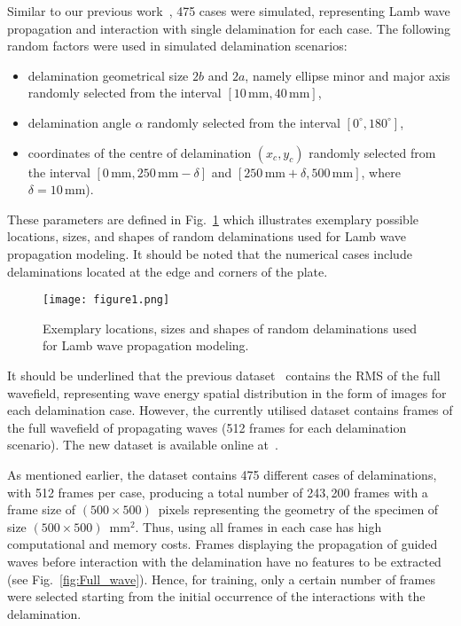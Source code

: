 \begin{sloppypar}
	Similar to our previous work~\cite{Ijjeh2021, Ijjeh2022}, 475 cases were simulated, representing Lamb wave propagation and interaction with single delamination for each case. 
	The following random factors were used in simulated delamination scenarios:
	\begin{itemize}
		\item delamination geometrical size	\(2b\) and \(2a\), namely ellipse minor and major axis randomly selected from the interval \(\left[10 \, \textrm{mm}, 40\, \textrm{mm}\right]\),
		\item delamination angle \(\alpha\) randomly selected from the interval \( \left[ 0^{\circ}, 180^{\circ} \right]\),
		\item coordinates of the centre of delamination \((x_c,y_c)\) randomly selected from the interval \(\left[0\, \textrm{mm}, 250\, \textrm{mm} -\delta \right]\) and \( \left[250\, \textrm{mm}+\delta, 500\, \textrm{mm} \right] \), where \(\delta = 10\, \textrm{mm}\)).
	\end{itemize}
	These parameters are defined in Fig.~\ref{fig:random_delaminations} which illustrates exemplary possible locations, sizes, and shapes of random delaminations used for Lamb wave propagation modeling.
	It should be noted that the numerical cases include delaminations located at the edge and corners of the plate.
	\DIFaddbegin {}\DIFaddend \begin{figure}[!ht]
		\centering
		\texttt{[image: figure1.png]}
		\caption{Exemplary locations, sizes and shapes of random delaminations used for Lamb wave propagation modeling.}
		\label{fig:random_delaminations}
	\end{figure}

	It should be underlined that the previous dataset~\cite{Kudela2020d} contains the RMS of the full wavefield, representing wave energy spatial distribution in the form of images for each delamination case.
	However, the currently utilised dataset contains frames of the full wavefield of propagating waves (512 frames for each delamination scenario).
	The new dataset is available online at~\cite{kudela_pawel_2021_5414555}.

	As mentioned earlier, the dataset contains 475 different cases of delaminations, with 512 frames per case, producing a total number of 243,\,200 frames with a frame size of \((500\times500)\)~pixels representing the geometry of the specimen of size \((500\times500)\)~mm\(^{2}\).
	Thus, using all frames in each case has high computational and memory costs.
	Frames displaying the propagation of guided waves before interaction with the delamination have no features to be extracted (see Fig.~\ref{fig:Full_wave}).
	Hence, for training, only a certain number of frames were selected starting from the initial occurrence of the interactions with the delamination.


\end{sloppypar}
